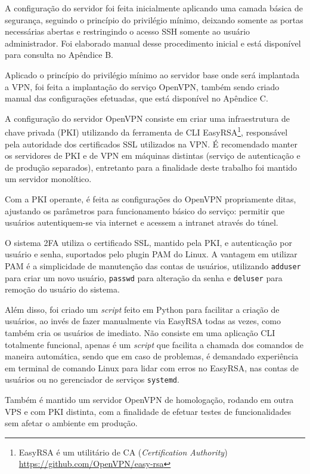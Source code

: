     A configuração do servidor foi feita inicialmente aplicando uma camada básica de segurança, seguindo o princípio do privilégio mínimo, deixando somente as portas necessárias abertas e restringindo o acesso SSH somente ao usuário administrador. Foi elaborado manual desse procedimento inicial e está disponível para consulta no Apêndice B.
    
    Aplicado o princípio do privilégio mínimo ao servidor base onde será implantada a VPN, foi feita a implantação do serviço OpenVPN, também sendo criado manual das configurações efetuadas, que está disponível no Apêndice C.
    
    A configuração do servidor OpenVPN consiste em criar uma infraestrutura de chave privada (PKI) utilizando da ferramenta de CLI EasyRSA\footnote{EasyRSA é um utilitário de CA (\textit{Certification Authority}) \url{https://github.com/OpenVPN/easy-rsa}}, responsável pela autoridade dos certificados SSL utilizados na VPN. É recomendado manter os servidores de PKI e de VPN em máquinas distintas (serviço de autenticação e de produção separados), entretanto para a finalidade deste trabalho foi mantido um servidor monolítico.
    
    Com a PKI operante, é feita as configurações do OpenVPN propriamente ditas, ajustando os parâmetros para funcionamento básico do serviço: permitir que usuários autentiquem-se via internet e acessem a intranet através do túnel.
    
    O sistema 2FA utiliza o certificado SSL, mantido pela PKI, e autenticação por usuário e senha, suportados pelo plugin PAM do Linux. A vantagem em utilizar PAM é a simplicidade de manutenção das contas de usuários, utilizando {\tt adduser} para criar um novo usuário, {\tt passwd} para alteração da senha e {\tt deluser} para remoção do usuário do sistema.
    
    Além disso, foi criado um \textit{script} feito em Python para facilitar a criação de usuários, ao invés de fazer manualmente via EasyRSA todas as vezes, como também cria os usuários de imediato. Não consiste em uma aplicação CLI totalmente funcional, apenas é um \textit{script} que facilita a chamada dos comandos de maneira automática, sendo que em caso de problemas, é demandado experiência em terminal de comando Linux para lidar com erros no EasyRSA, nas contas de usuários ou no gerenciador de serviços {\tt systemd}.
    
    Também é mantido um servidor OpenVPN de homologação, rodando em outra VPS e com PKI distinta, com a finalidade de efetuar testes de funcionalidades sem afetar o ambiente em produção.
    
